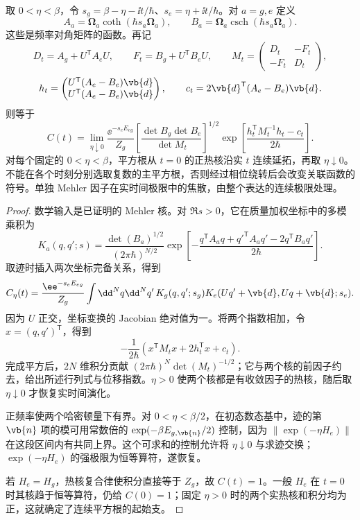 \begin{proposition}[一般双谐振势能面的热关联]
取 $0<\eta<\beta$，令 $s_g=\beta-\eta-\ii t/\hbar$、$s_e=\eta+\ii t/\hbar$。对 $a=g,e$ 定义
\begin{equation}
 A_a=\boldsymbol\Omega_a\coth(\hbar s_a\boldsymbol\Omega_a),
 \qquad B_a=\boldsymbol\Omega_a\operatorname{csch}(\hbar s_a\boldsymbol\Omega_a).
 \label{eq:coherent-state-propagator}
\end{equation}
这些是频率对角矩阵的函数。再记
\[
 D_t=A_g+U^{\mathsf T}A_eU,\qquad
 F_t=B_g+U^{\mathsf T}B_eU,\qquad
 M_t=\begin{pmatrix}D_t&-F_t\\-F_t&D_t\end{pmatrix},
\]
\[
 h_t=\begin{pmatrix}U^{\mathsf T}(A_e-B_e)\vb{d}\\
                     U^{\mathsf T}(A_e-B_e)\vb{d}\end{pmatrix},
 \qquad c_t=2\vb{d}^{\mathsf T}(A_e-B_e)\vb{d}.
\]
则等于
\begin{equation}
 C(t)=\lim_{\eta\downarrow0}
 \frac{\ee^{-s_eE_{eg}}}{Z_g}
 \left[\frac{\det B_g\det B_e}{\det M_t}\right]^{1/2}
 \exp\!\left[\frac{h_t^{\mathsf T}M_t^{-1}h_t-c_t}{2\hbar}\right].
 \label{eq:multimode-fc-generating-function}
\end{equation}
对每个固定的 $0<\eta<\beta$，平方根从 $t=0$ 的正热核沿实 $t$ 连续延拓，再取 $\eta\downarrow0$。不能在各个时刻分别选取复数的主平方根，否则经过相位绕转后会改变关联函数的符号。单独 Mehler 因子在实时间极限中的焦散，由整个表达的连续极限处理。
\end{proposition}
\begin{proof}
数学输入是已证明的 Mehler 核。对 $\Re s>0$，它在质量加权坐标中的多模乘积为
\[
 K_a(q,q';s)=\frac{\det(B_a)^{1/2}}{(2\pi\hbar)^{N/2}}
 \exp\!\left[-\frac{q^{\mathsf T}A_aq+{q'}^{\mathsf T}A_aq'
                         -2q^{\mathsf T}B_aq'}{2\hbar}\right].
\]
取迹时插入两次坐标完备关系，得到
\[
 C_\eta(t)=\frac{\ee^{-s_eE_{eg}}}{Z_g}
 \int\dd^Nq\dd^Nq'\,
 K_g(q,q';s_g)K_e(Uq'+\vb{d},Uq+\vb{d};s_e).
\]
因为 $U$ 正交，坐标变换的 Jacobian 绝对值为一。将两个指数相加，令 $x=(q,q')^{\mathsf T}$，得到
\[
 -\frac1{2\hbar}(x^{\mathsf T}M_tx+2h_t^{\mathsf T}x+c_t).
\]
完成平方后，$2N$ 维积分贡献 $(2\pi\hbar)^N\det(M_t)^{-1/2}$；它与两个核的前因子约去，给出所述行列式与位移指数。$\eta>0$ 使两个核都是有收敛因子的热核，随后取 $\eta\downarrow0$ 才恢复实时间演化。

正频率使两个哈密顿量下有界。对 $0<\eta<\beta/2$，在初态数态基中，迹的第 $\vb{n}$ 项的模可用常数倍的 $\exp(-\beta E_{g,\vb{n}}/2)$ 控制，因为 $\|\exp(-\eta H_e)\|$ 在这段区间内有共同上界。这个可求和的控制允许将 $\eta\downarrow0$ 与求迹交换；$\exp(-\eta H_e)$ 的强极限为恒等算符，遂恢复。

若 $H_e=H_g$，热核复合律使积分直接等于 $Z_g$，故 $C(t)=1$。一般 $H_e$ 在 $t=0$ 时其核趋于恒等算符，仍给 $C(0)=1$；固定 $\eta>0$ 时的两个实热核和积分均为正，这就确定了连续平方根的起始支。
\end{proof}

